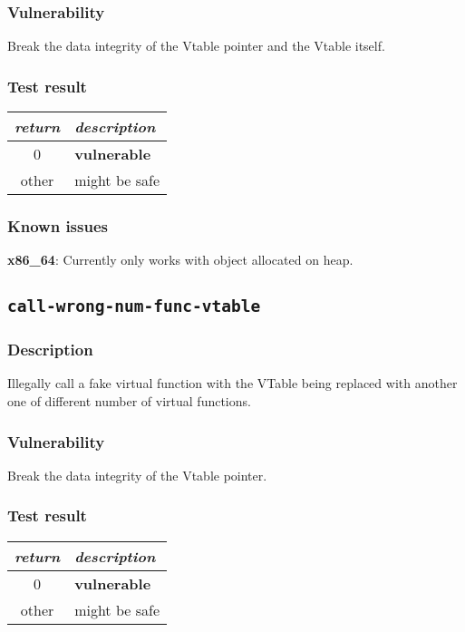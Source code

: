 \documentclass[a4paper]{book}
\begin{document}
\subsubsection{Vulnerability}
Break the data integrity of the Vtable pointer and the Vtable itself.

\subsubsection{Test result}
\begin{tabular}{cl}
  \toprule
  \emph{return}  & \emph{description} \\
  \midrule
  0              & \textbf{vulnerable} \\
  other          & might be safe \\
  \bottomrule
\end{tabular}

\subsubsection{Known issues}

\textbf{x86\_64}: Currently only works with object allocated on heap.

\newpage
\subsection{\texttt{call-wrong-num-func-vtable}}\label{test-call-wrong-num-func-vtable}

\subsubsection{Description}
Illegally call a fake virtual function with the VTable being replaced with another one of different number of virtual functions.

\subsubsection{Vulnerability}
Break the data integrity of the Vtable pointer.

\subsubsection{Test result}
\begin{tabular}{cl}
  \toprule
  \emph{return}  & \emph{description} \\
  \midrule
  0              & \textbf{vulnerable} \\
  other          & might be safe \\
  \bottomrule
\end{tabular}
\end{document}

